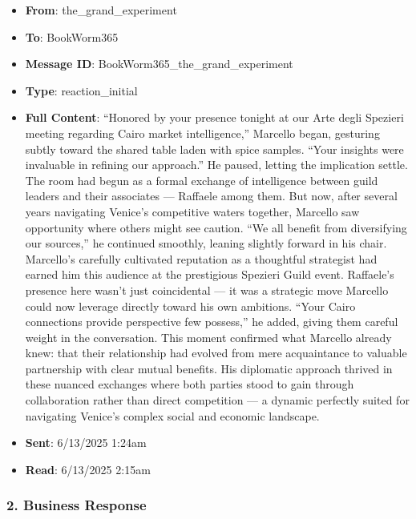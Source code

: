 \documentclass[11pt,a4paper]{article}
\begin{document}
\begin{itemize}
\item \textbf{From}: the\_grand\_experiment
\item \textbf{To}: BookWorm365
\item \textbf{Message ID}: BookWorm365\_the\_grand\_experiment
\item \textbf{Type}: reaction\_initial
\item \textbf{Full Content}: ``Honored by your presence tonight at our Arte degli Spezieri meeting regarding Cairo market intelligence,'' Marcello began, gesturing subtly toward the shared table laden with spice samples. ``Your insights were invaluable in refining our approach.'' He paused, letting the implication settle. The room had begun as a formal exchange of intelligence between guild leaders and their associates --- Raffaele among them. But now, after several years navigating Venice's competitive waters together, Marcello saw opportunity where others might see caution. ``We all benefit from diversifying our sources,'' he continued smoothly, leaning slightly forward in his chair. Marcello's carefully cultivated reputation as a thoughtful strategist had earned him this audience at the prestigious Spezieri Guild event. Raffaele's presence here wasn't just coincidental --- it was a strategic move Marcello could now leverage directly toward his own ambitions. ``Your Cairo connections provide perspective few possess,'' he added, giving them careful weight in the conversation. This moment confirmed what Marcello already knew: that their relationship had evolved from mere acquaintance to valuable partnership with clear mutual benefits. His diplomatic approach thrived in these nuanced exchanges where both parties stood to gain through collaboration rather than direct competition --- a dynamic perfectly suited for navigating Venice's complex social and economic landscape.
\item \textbf{Sent}: 6/13/2025 1:24am
\item \textbf{Read}: 6/13/2025 2:15am
\end{itemize}

\subsubsection{2. Business Response}
\end{document}
